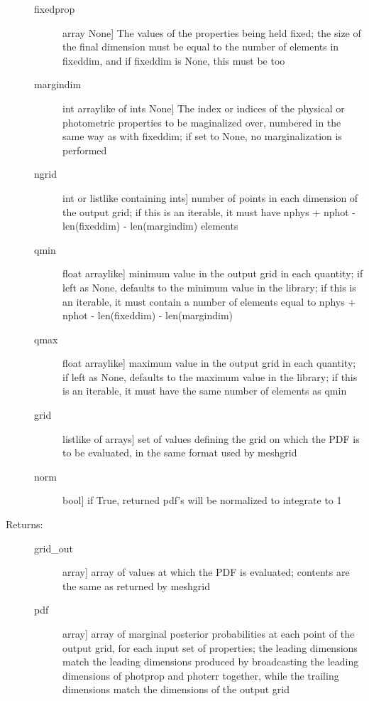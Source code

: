 \documentclass[letterpaper,10pt,english]{sphinxmanual}
\begin{document}
\begin{fulllineitems}
\begin{fulllineitems}
\begin{description}
\begin{description}
\item[{fixedprop}] \leavevmode{[}array \textbar{} None{]}
The values of the properties being held fixed; the size
of the final dimension must be equal to the number of
elements in fixeddim, and if fixeddim is None, this must
be too

\item[{margindim}] \leavevmode{[}int \textbar{} arraylike of ints \textbar{} None{]}
The index or indices of the physical or photometric
properties to be maginalized over, numbered in the same
way as with fixeddim; if set to None, no marginalization
is performed

\item[{ngrid}] \leavevmode{[}int or listlike containing ints{]}
number of points in each dimension of the output grid;
if this is an iterable, it must have nphys + nphot -
len(fixeddim) - len(margindim) elements

\item[{qmin}] \leavevmode{[}float \textbar{} arraylike{]}
minimum value in the output grid in each quantity; if
left as None, defaults to the minimum value in the
library; if this is an iterable, it must contain a
number of elements equal to nphys + nphot -
len(fixeddim) - len(margindim)

\item[{qmax}] \leavevmode{[}float \textbar{} arraylike{]}
maximum value in the output grid in each quantity; if
left as None, defaults to the maximum value in the
library; if this is an iterable, it must have the same
number of elements as qmin

\item[{grid}] \leavevmode{[}listlike of arrays{]}
set of values defining the grid on which the PDF is to
be evaluated, in the same format used by meshgrid

\item[{norm}] \leavevmode{[}bool{]}
if True, returned pdf’s will be normalized to integrate
to 1

\end{description}

\item[{Returns:}] \leavevmode\begin{description}
\item[{grid\_out}] \leavevmode{[}array{]}
array of values at which the PDF is evaluated; contents
are the same as returned by meshgrid

\item[{pdf}] \leavevmode{[}array{]}
array of marginal posterior probabilities at each point
of the output grid, for each input set of properties; the leading
dimensions match the leading dimensions produced by
broadcasting the leading dimensions of photprop and
photerr together, while the trailing dimensions match
the dimensions of the output grid


\end{description}
\end{description}
\end{fulllineitems}
\end{fulllineitems}
\end{document}
